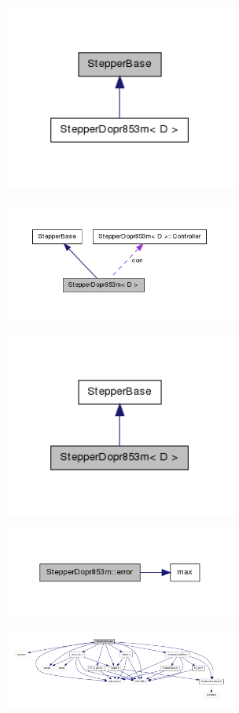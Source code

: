 \includegraphics[width=3in]{figures/class_stepper_base__inherit__graph.png}

\includegraphics[width=3in]{figures/class_stepper_dopr853m__coll__graph.png}

\includegraphics[width=3in]{figures/class_stepper_dopr853m__inherit__graph.png}

\includegraphics[width=3in]{figures/class_stepper_dopr853m_a05acb9133063a88b1d70681194723766_cgraph.png}

\includegraphics[width=3in]{figures/mainwindow_8cpp__incl.png}


